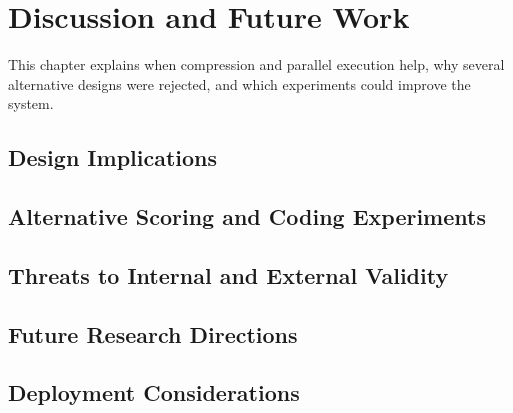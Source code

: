 \chapter{Discussion and Future Work}
\label{ch:discussion}

This chapter explains when compression and parallel execution help,
why several alternative designs were rejected, and which experiments
could improve the system.

\section{Design Implications}
\label{sec:8-1}


\section{Alternative Scoring and Coding Experiments}
\label{sec:8-2}


\section{Threats to Internal and External Validity}
\label{sec:8-3}


\section{Future Research Directions}
\label{sec:8-4}


\section{Deployment Considerations}
\label{sec:8-5}

